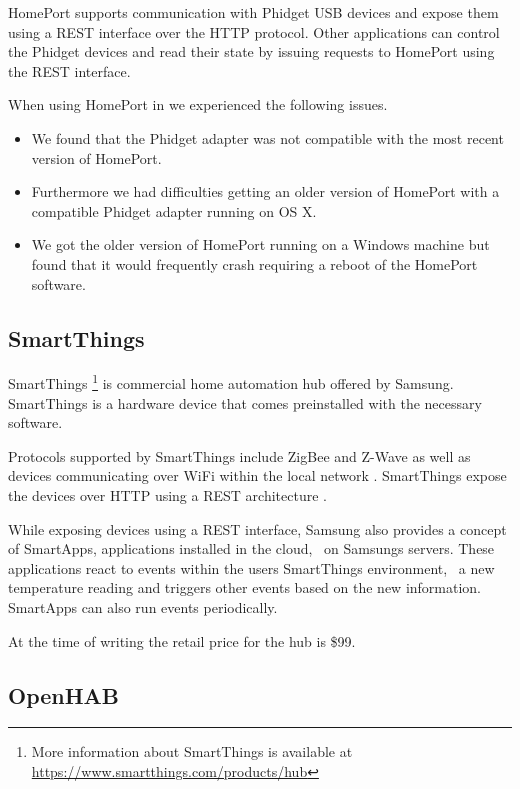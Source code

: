HomePort supports communication with Phidget USB devices and expose them using a REST interface over the HTTP protocol. Other applications can control the Phidget devices and read their state by issuing requests to HomePort using the REST interface.

When using HomePort in \cite{prespecialisation} we experienced the following issues.

\begin{itemize}
\item We found that the Phidget adapter was not compatible with the most recent version of HomePort.
\item Furthermore we had difficulties getting an older version of HomePort with a compatible Phidget adapter running on OS X.
\item We got the older version of HomePort running on a Windows machine but found that it would frequently crash requiring a reboot of the HomePort software.
\end{itemize}

\subsection{SmartThings}
\label{sec:analysis:choice-of-hub:smartthings}

SmartThings \cite{SMARTTHINGS}\footnote{More information about SmartThings is available at \url{https://www.smartthings.com/products/hub}} is commercial home automation hub offered by Samsung. SmartThings is a hardware device that comes preinstalled with the necessary software.

Protocols supported by SmartThings include ZigBee and Z-Wave as well as devices communicating over WiFi within the local network \cite{smartthings:compatible-products}. SmartThings expose the devices over HTTP using a REST architecture \cite{smartthings:developer}.

While exposing devices using a REST interface, Samsung also provides a concept of SmartApps, applications installed in the cloud, \ie~on Samsungs servers. These applications react to events within the users SmartThings environment, \ie~a new temperature reading and triggers other events based on the new information. SmartApps can also run events periodically.

At the time of writing the retail price for the hub is \$99.

\subsection{OpenHAB}
\label{sec:analysis:choice-of-hub:openhab}

